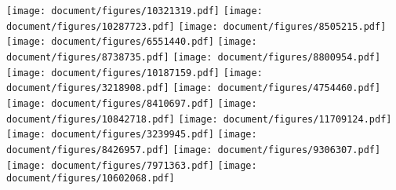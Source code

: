 \texttt{[image: document/figures/10321319.pdf]}
\texttt{[image: document/figures/10287723.pdf]}
\texttt{[image: document/figures/8505215.pdf]}
\texttt{[image: document/figures/6551440.pdf]}
\texttt{[image: document/figures/8738735.pdf]}
\texttt{[image: document/figures/8800954.pdf]}
\texttt{[image: document/figures/10187159.pdf]}
\texttt{[image: document/figures/3218908.pdf]}
\texttt{[image: document/figures/4754460.pdf]}
\texttt{[image: document/figures/8410697.pdf]}
\texttt{[image: document/figures/10842718.pdf]}
\texttt{[image: document/figures/11709124.pdf]}
\texttt{[image: document/figures/3239945.pdf]}
\texttt{[image: document/figures/8426957.pdf]}
\texttt{[image: document/figures/9306307.pdf]}
\texttt{[image: document/figures/7971363.pdf]}
\texttt{[image: document/figures/10602068.pdf]}
